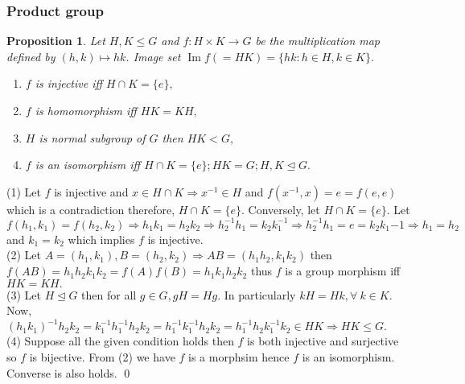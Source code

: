 \documentclass[11pt]{amsart}
\newtheorem{prop}[theorem]{Proposition}
\DeclareMathOperator{\im}{\text{Im}}
\begin{document}
\subsubsection{Product group}
\begin{prop}
Let $H,K\leq G$ and $f:H\times K\to G$ be the multiplication map defined by $(h,k)\mapsto hk$. Image set $\im f(=HK)=\{hk:h\in H,k\in K\}.$ \begin{enumerate}
\item $f$ is injective iff $H\cap K=\{e\},$
\item $f$ is homomorphism iff $HK=KH,$
\item $H$ is normal subgroup of $G$ then $HK<G,$
\item $f$ is an isomorphism iff $H\cap K=\{e\}; HK=G; H,K\unlhd G.$
\end{enumerate}
\end{prop}
\proof (1) Let $f$ is injective and $x\in H\cap K \Rightarrow x^{-1}\in H$ and $f(x^{-1},x)=e=f(e,e)$ which is a contradiction therefore, $H\cap K=\{e\}.$ Conversely, let $H\cap K=\{e\}$. Let $f(h_1,k_1)=f(h_2,k_2) \Rightarrow h_1k_1=h_2k_2 \Rightarrow h_2^{-1}h_1=k_2k_1^{-1} \Rightarrow h_2^{-1}h_1=e=k_2k_1{-1} \Rightarrow h_1=h_2$ and $k_1=k_2$ which implies $f$ is injective.\\
(2) Let $A=(h_1,k_1),B=(h_2,k_2) \Rightarrow AB=(h_1h_2,k_1k_2)$ then $f(AB)=h_1h_2k_1k_2=f(A)f(B)=h_1k_1h_2k_2$ thus $f$ is a group morphism iff $HK=KH.$\\
(3) Let $H\unlhd G$ then for all $g\in G, gH=Hg.$ In particularly $kH=Hk,\forall~k\in K.$ Now, $(h_1k_1)^{-1}h_2k_2=k_1^{-1}h_1^{-1}h_2k_2=h_1^{-1}k_1^{-1}h_2k_2=h_1^{-1}h_2k^{-1}_1k_2\in HK \Rightarrow HK\leq G.$\\
(4) Suppose all the given condition holds then $f$ is both injective and surjective so $f$ is bijective. From (2) we have $f$ is a morphsim hence $f$ is an isomorphism. Converse is also holds. \qed




























\newpage
\end{document}
